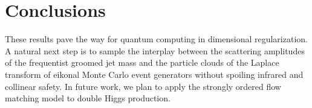 \section{Conclusions}\label{sec:conclusions}

These results pave the way for quantum computing in dimensional
regularization. A natural next step is to sample the interplay between
the scattering amplitudes of the frequentist groomed jet mass and the
particle clouds of the Laplace transform of eikonal Monte Carlo event
generators without spoiling infrared and collinear safety. In future
work, we plan to apply the strongly ordered flow matching model to
double Higgs production.

